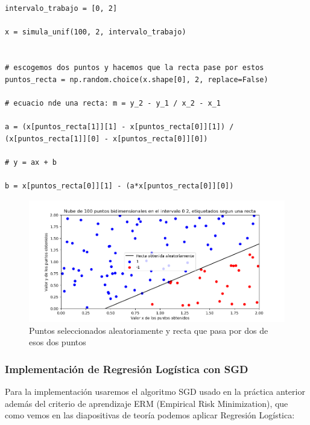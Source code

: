 \documentclass[12pt, spanish]{article}
\begin{document}
\begin{lstlisting}
intervalo_trabajo = [0, 2]

x = simula_unif(100, 2, intervalo_trabajo)


# escogemos dos puntos y hacemos que la recta pase por estos
puntos_recta = np.random.choice(x.shape[0], 2, replace=False)

# ecuacio nde una recta: m = y_2 - y_1 / x_2 - x_1

a = (x[puntos_recta[1]][1] - x[puntos_recta[0]][1]) / (x[puntos_recta[1]][0] - x[puntos_recta[0]][0])

# y = ax + b

b = x[puntos_recta[0]][1] - (a*x[puntos_recta[0]][0])
\end{lstlisting}

\begin{figure}[H]
  \centering
      \includegraphics[scale = 0.70]{ej-2-puntos.png}
 		 \caption{Puntos seleccionados aleatoriamente y recta que pasa por dos de esos dos puntos}
  		\label{fig:ej2-puntos}

\end{figure}

\subsubsection{Implementación de Regresión Logística con SGD}

Para la implementación usaremos el algoritmo SGD usado en la práctica anterior además del criterio de aprendizaje ERM (Empirical Risk Minimization), que como vemos en las diapositivas de teoría podemos aplicar Regresión Logística:
\end{document}
